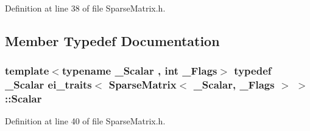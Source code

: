 Definition at line 38 of file Sparse\-Matrix.\-h.



\subsection{Member Typedef Documentation}
\hypertarget{structei__traits_3_01_sparse_matrix_3_01___scalar_00_01___flags_01_4_01_4_ab54b025a0e3fc516465e076dacb0e793}{
\subsubsection[{Scalar}]{\setlength{\rightskip}{0pt plus 5cm}template$<$typename \-\_\-\-Scalar , int \-\_\-\-Flags$>$ typedef \-\_\-\-Scalar {\bf ei\-\_\-traits}$<$ {\bf Sparse\-Matrix}$<$ \-\_\-\-Scalar, \-\_\-\-Flags $>$ $>$\-::{\bf Scalar}}}\label{structei__traits_3_01_sparse_matrix_3_01___scalar_00_01___flags_01_4_01_4_ab54b025a0e3fc516465e076dacb0e793}


Definition at line 40 of file Sparse\-Matrix.\-h.



